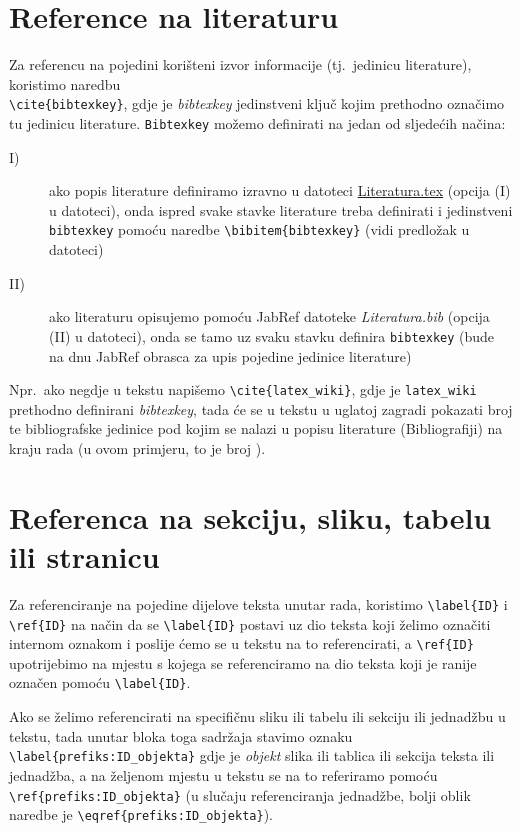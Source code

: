\section{Reference na literaturu} \label{sec:RefLit}
Za referencu na pojedini korišteni izvor informacije (tj.\ jedinicu literature), koristimo naredbu \\
\verb|\cite{bibtexkey}|, gdje je \emph{bibtexkey} jedinstveni ključ kojim prethodno označimo tu jedinicu literature. \verb|Bibtexkey| možemo definirati na jedan od sljedećih načina:
\begin{description}
	\item[I)] ako popis literature definiramo izravno u datoteci \href{run:Literatura.tex}{{\color{blue}Literatura.tex}} (opcija (I) u datoteci), onda ispred svake stavke literature treba definirati i jedinstveni \verb|bibtexkey| pomoću naredbe \verb|\bibitem{bibtexkey}| (vidi predložak u datoteci)
	\item[II)] ako literaturu opisujemo pomoću JabRef datoteke \emph{Literatura.bib} (opcija (II) u datoteci), onda se tamo uz svaku stavku definira \verb|bibtexkey| (bude na dnu JabRef obrasca za upis pojedine jedinice literature)
\end{description}
%
Npr.\ ako negdje u tekstu napišemo \verb|\cite{latex_wiki}|, gdje je \verb|latex_wiki| prethodno definirani \emph{bibtexkey}, tada će se u tekstu u uglatoj zagradi pokazati broj  te bibliografske jedinice pod kojim se nalazi u popisu literature (Bibliografiji) na kraju rada (u ovom primjeru, to je broj \cite{latex_wiki}).


\section{Referenca na sekciju, sliku, tabelu ili stranicu} \label{sec:RefText}

Za referenciranje na pojedine dijelove teksta unutar rada, koristimo
{\color{red} \verb|\label{ID}|} i {\color{red} \verb|\ref{ID}|} na način da se \verb|\label{ID}| postavi uz dio teksta koji želimo označiti internom oznakom i poslije ćemo se u tekstu na to referencirati, a \verb|\ref{ID}| upotrijebimo na mjestu s kojega se referenciramo na dio teksta koji je ranije označen pomoću \verb|\label{ID}|.

Ako se želimo referencirati na specifičnu sliku ili tabelu ili sekciju ili jednadžbu u tekstu, tada unutar bloka toga sadržaja stavimo oznaku \verb|\label{prefiks:ID_objekta}| gdje je \emph{objekt} slika ili tablica ili sekcija teksta ili jednadžba, a na željenom mjestu u tekstu se na to referiramo pomoću \verb|\ref{prefiks:ID_objekta}| (u slučaju referenciranja jednadžbe, bolji oblik naredbe je {\color{red} \verb|\eqref{prefiks:ID_objekta}|}).

